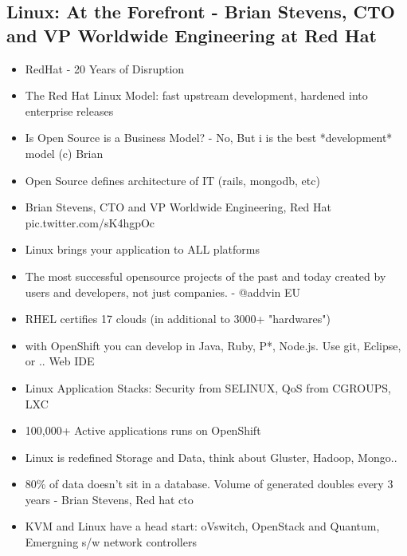 \documentclass[10pt]{article}
\begin{document}
{\subsection{Linux: At the Forefront - Brian Stevens, CTO and VP Worldwide Engineering at Red Hat}
\begin{itemize}
\item RedHat - 20 Years of Disruption
\item The Red Hat Linux Model: fast upstream development, hardened into enterprise releases
\item Is Open Source is a Business Model? - No, But i is the best *development* model (c) Brian
\item Open Source defines architecture of IT (rails, mongodb, etc)
\item Brian Stevens, CTO and VP Worldwide Engineering, Red Hat pic.twitter.com/sK4hgpOc
\item Linux brings your application to ALL platforms
\item The most successful opensource projects of the past and today created by users and developers, not just companies. - @addvin  EU
\item RHEL certifies 17 clouds (in additional to 3000+ "hardwares")
\item with OpenShift you can develop in Java, Ruby, P*, Node.js. Use git, Eclipse, or .. Web IDE
\item Linux Application Stacks: Security from SELINUX, QoS from CGROUPS, LXC
\item 100,000+ Active applications runs on OpenShift
\item Linux is redefined Storage and Data, think about Gluster, Hadoop, Mongo..
\item 80\% of data doesn't sit in a database. Volume of generated doubles every 3 years - Brian Stevens, Red hat cto 
\item KVM and Linux have a head start: oVswitch, OpenStack and Quantum, Emergning s/w network controllers
\end{itemize}

}
\end{document}
